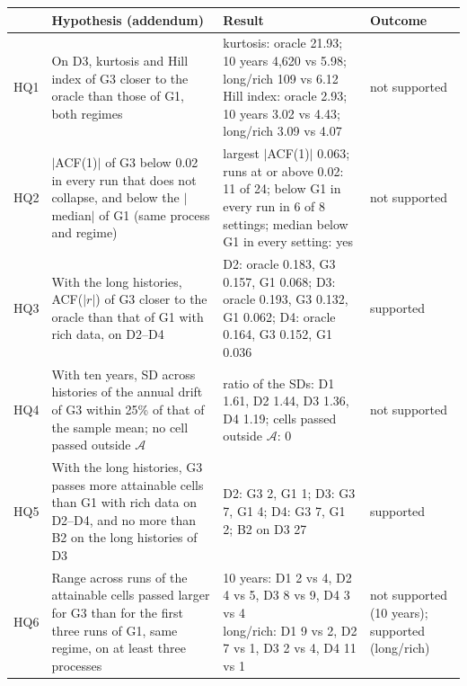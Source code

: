 \begin{tabular}{llll}
\toprule
& Hypothesis (addendum) & Result & Outcome \\
\midrule
HQ1 & \parbox[t]{4.3cm}{\raggedright On D3, kurtosis and Hill index of G3 closer to the oracle than those of G1, both regimes\strut} & \parbox[t]{6.4cm}{\raggedright kurtosis: oracle 21.93; 10 years 4{,}620 vs 5.98; long/rich 109 vs 6.12 \newline Hill index: oracle 2.93; 10 years 3.02 vs 4.43; long/rich 3.09 vs 4.07\strut} & \parbox[t]{2.0cm}{\raggedright not supported\strut} \\
\addlinespace
HQ2 & \parbox[t]{4.3cm}{\raggedright $|$ACF(1)$|$ of G3 below 0.02 in every run that does not collapse, and below the $|$median$|$ of G1 (same process and regime)\strut} & \parbox[t]{6.4cm}{\raggedright largest $|$ACF(1)$|$ 0.063; runs at or above 0.02: 11 of 24; below G1 in every run in 6 of 8 settings; median below G1 in every setting: yes\strut} & \parbox[t]{2.0cm}{\raggedright not supported\strut} \\
\addlinespace
HQ3 & \parbox[t]{4.3cm}{\raggedright With the long histories, ACF($|r|$) of G3 closer to the oracle than that of G1 with rich data, on D2--D4\strut} & \parbox[t]{6.4cm}{\raggedright D2: oracle 0.183, G3 0.157, G1 0.068; D3: oracle 0.193, G3 0.132, G1 0.062; D4: oracle 0.164, G3 0.152, G1 0.036\strut} & \parbox[t]{2.0cm}{\raggedright supported\strut} \\
\addlinespace
HQ4 & \parbox[t]{4.3cm}{\raggedright With ten years, SD across histories of the annual drift of G3 within 25\% of that of the sample mean; no cell passed outside $\mathcal{A}$\strut} & \parbox[t]{6.4cm}{\raggedright ratio of the SDs: D1 1.61, D2 1.44, D3 1.36, D4 1.19; cells passed outside $\mathcal{A}$: 0\strut} & \parbox[t]{2.0cm}{\raggedright not supported\strut} \\
\addlinespace
HQ5 & \parbox[t]{4.3cm}{\raggedright With the long histories, G3 passes more attainable cells than G1 with rich data on D2--D4, and no more than B2 on the long histories of D3\strut} & \parbox[t]{6.4cm}{\raggedright D2: G3 2, G1 1; D3: G3 7, G1 4; D4: G3 7, G1 2; B2 on D3 27\strut} & \parbox[t]{2.0cm}{\raggedright supported\strut} \\
\addlinespace
HQ6 & \parbox[t]{4.3cm}{\raggedright Range across runs of the attainable cells passed larger for G3 than for the first three runs of G1, same regime, on at least three processes\strut} & \parbox[t]{6.4cm}{\raggedright 10 years: D1 2 vs 4, D2 4 vs 5, D3 8 vs 9, D4 3 vs 4 \newline long/rich: D1 9 vs 2, D2 7 vs 1, D3 2 vs 4, D4 11 vs 1\strut} & \parbox[t]{2.0cm}{\raggedright not supported (10 years); supported (long/rich)\strut} \\
\bottomrule
\end{tabular}
